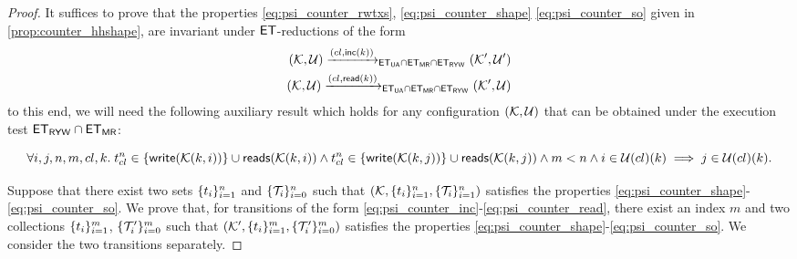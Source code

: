 \begin{proof}
It suffices to prove that the properties \eqref{eq:psi_counter_rwtxs}, \eqref{eq:psi_counter_shape} 
\eqref{eq:psi_counter_so} given in \cref{prop:counter_hhshape}, are invariant under 
$\mathsf{ET}$-reductions of the form 
\begin{align}
(\hh, \viewFun) \xrightarrow{(\cl, \mathsf{inc}(\ke))}_{\ET_{\UA} \cap \ET_{\MRd} \cap \ET_{\RYW}} (\hh', \viewFun') \label{eq:psi_counter_inc}\\
(\hh, \viewFun) \xrightarrow{(\cl, \mathsf{read}(\ke))}_{\ET_{\UA} \cap \ET_{\MRd} \cap \ET_{\RYW}} (\hh', \viewFun) \label{eq:psi_counter_read}
\end{align}
to this end, we will need the following auxiliary result which holds for any configuration $(\mathcal{K}, \mathcal{U})$ 
that can be obtained under the execution test $\mathsf{ET}_{\mathsf{RYW}} \cap \mathsf{ET}_{\mathsf{MR}}$:


\begin{equation}
\forall i, j, n,m, \cl, \ke. \; \txid_{\cl}^{n} \in \{\WTx(\hh(\ke, i))\} \cup \RTx(\hh(\ke, i)) 
\wedge \txid_{\cl}^{n} \in \{\WTx(\hh(\ke, j))\} \cup \RTx(\hh(\ke, j)) \wedge m < n 
\wedge i \in \viewFun(\cl)(\ke) \implies 
j \in \viewFun(\cl)(\ke). \label{eq:psi_counter_view}
\end{equation} 

Suppose that there exist two sets $\{t_{i}\}_{i=1}^{n}$ and 
$\{\mathcal{T}_{i}\}_{i=0}^{n}$ such that $(\mathcal{K}, \{t_{i}\}_{i=1}^{n}, \{\mathcal{T}_{i}\}_{i=1}^{n})$ 
satisfies the properties \eqref{eq:psi_counter_shape}-\eqref{eq:psi_counter_so}. 
We prove that, for transitions of the form \eqref{eq:psi_counter_inc}-\eqref{eq:psi_counter_read}, 
there exist an index $m$ and two collections $\{t_{i}\}_{i=1}^{m}$, $\{\mathcal{T}'_{i}\}_{i=0}^{m}$ 
such that $(\mathcal{K}', \{t_{i}\}_{i=1}^{m}, \{\mathcal{T}'_{i}\}_{i=0}^{m})$ satisfies the properties 
\eqref{eq:psi_counter_shape}-\eqref{eq:psi_counter_so}. We consider the two transitions separately.


\end{proof}
